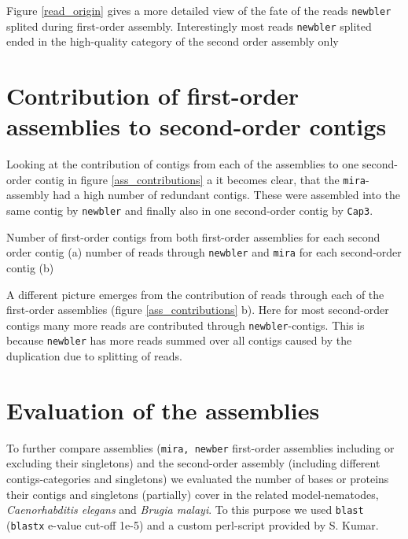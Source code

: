 
Figure \ref{read_origin} gives a more detailed view of the fate of the
reads \texttt{newbler} splited during first-order
assembly. Interestingly most reads \texttt{newbler} splited ended in
the high-quality category of the second order assembly only 

\section{Contribution of first-order assemblies to second-order contigs}
\label{sec:contr-firs-order}

Looking at the contribution of contigs from each of the assemblies to
one second-order contig in figure \ref{ass_contributions} a it becomes
clear, that the \texttt{mira}-assembly had a high number of redundant
contigs. These were assembled into the same contig by \texttt{newbler}
and finally also in one second-order contig by \texttt{Cap3}.

{Number of first-order contigs from both first-order assemblies for
  each second order contig (a) number of reads through
  \texttt{newbler} and \texttt{mira} for each second-order contig (b)}

A different picture emerges from the contribution of reads through
each of the first-order assemblies (figure \ref{ass_contributions}
b). Here for most second-order contigs many more reads are contributed
through \texttt{newbler}-contigs. This is because \texttt{newbler} has
more reads summed over all contigs caused by the duplication due to
splitting of reads.

\section{Evaluation of the assemblies}
\label{sec:eval-three-assembl}

To further compare assemblies (\texttt{mira, newber} first-order
assemblies including or excluding their singletons) and the
second-order assembly (including different contigs-categories and
singletons) we evaluated the number of bases or proteins their contigs
and singletons (partially) cover in the related model-nematodes,
\textit{Caenorhabditis elegans} and \textit{Brugia malayi}. To this
purpose we used \texttt{blast} (\texttt{blastx} e-value cut-off 1e-5)
and a custom perl-script provided by S. Kumar.

